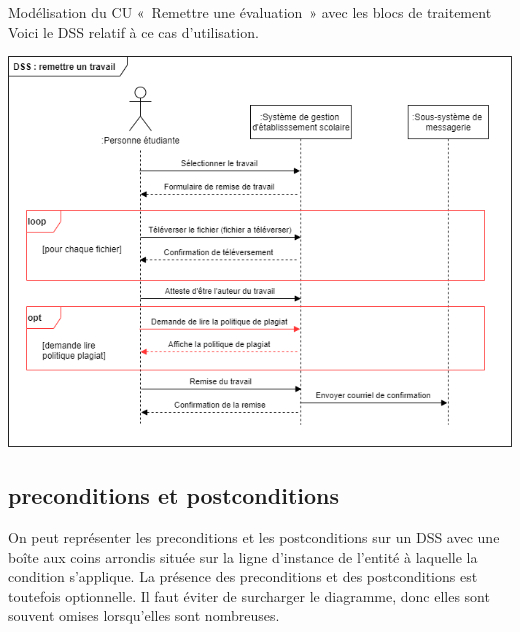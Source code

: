 \begin{exemple}{Modélisation du CU «~Remettre une évaluation~» avec les blocs de traitement}
	Voici le \gls{DSS} relatif à ce cas d'utilisation.
	
	\pagebreak
	
	\begin{center} 
		\includegraphics[width=.95\textwidth]{dss-Exemple-complet.png}
	\end{center}  
\end{exemple}

\subsection{\Glspl{precondition} et \glspl{postcondition}}

On peut représenter les \glspl{precondition} et les \glspl{postcondition} sur un \acrshort{DSS} avec une boîte aux coins arrondis située sur la ligne d'instance de l'entité à laquelle la condition s'applique. La présence des \glspl{precondition} et des \glspl{postcondition} est toutefois optionnelle. Il faut éviter de surcharger le diagramme, donc elles sont souvent omises lorsqu'elles sont nombreuses.

